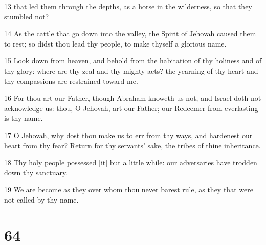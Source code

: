 \par 13 that led them through the depths, as a horse in the wilderness, so that they stumbled not?
\par 14 As the cattle that go down into the valley, the Spirit of Jehovah caused them to rest; so didst thou lead thy people, to make thyself a glorious name.
\par 15 Look down from heaven, and behold from the habitation of thy holiness and of thy glory: where are thy zeal and thy mighty acts? the yearning of thy heart and thy compassions are restrained toward me.
\par 16 For thou art our Father, though Abraham knoweth us not, and Israel doth not acknowledge us: thou, O Jehovah, art our Father; our Redeemer from everlasting is thy name.
\par 17 O Jehovah, why dost thou make us to err from thy ways, and hardenest our heart from thy fear? Return for thy servants' sake, the tribes of thine inheritance.
\par 18 Thy holy people possessed [it] but a little while: our adversaries have trodden down thy sanctuary.
\par 19 We are become as they over whom thou never barest rule, as they that were not called by thy name.

\chapter{64}

